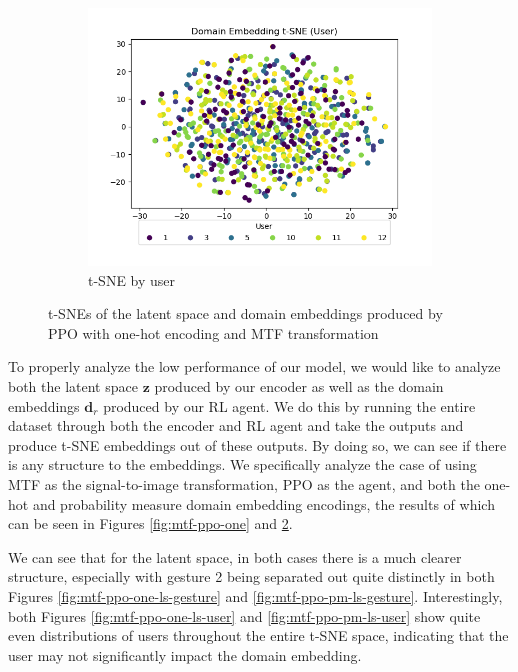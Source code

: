\begin{figure}
\begin{subfigure}{0.3\textwidth}
		\includegraphics[width=\textwidth]{figures/mtf-ppo-pm/de-user}
		\caption{t-SNE by user}
		\label{fig:mtf-ppo-pm-de-user}
	\end{subfigure}
	\caption{t-SNEs of the latent space and domain embeddings produced by PPO with one-hot encoding and MTF transformation}
	\label{fig:mtf-ppo-pm}
\end{figure}

To properly analyze the low performance of our model, we would like to analyze both the latent space $\boldsymbol{z}$ produced by our encoder as well as the domain embeddings $\boldsymbol{d}_{r}$ produced by our RL agent.
We do this by running the entire dataset through both the encoder and RL agent and take the outputs and produce t-SNE embeddings out of these outputs.
By doing so, we can see if there is any structure to the embeddings.
We specifically analyze the case of using MTF as the signal-to-image transformation, PPO as the agent, and both the one-hot and probability measure domain embedding encodings, the results of which can be seen in Figures \ref{fig:mtf-ppo-one} and \ref{fig:mtf-ppo-pm}.

We can see that for the latent space, in both cases there is a much clearer structure, especially with gesture 2 being separated out quite distinctly in both Figures \ref{fig:mtf-ppo-one-ls-gesture} and \ref{fig:mtf-ppo-pm-ls-gesture}. 
Interestingly, both Figures \ref{fig:mtf-ppo-one-ls-user} and \ref{fig:mtf-ppo-pm-ls-user} show quite even distributions of users throughout the entire t-SNE space, indicating that the user may not significantly impact the domain embedding. 

